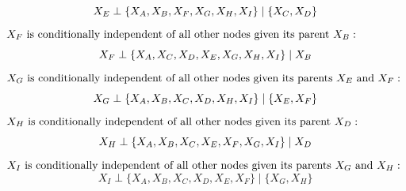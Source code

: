 \documentclass[a3paper,12pt]{extarticle} %
\begin{document}
\begin{enumerate}
\begin{enumerate}
    \)
    \[
        X_E \perp \{X_A, X_B, X_F, X_G, X_H, X_I\} \mid \{X_C, X_D\} \\
    \]
    \(
        X_F \text{ is conditionally independent of all other nodes given its parent } X_B: \\
    \)
    \[
        X_F \perp \{X_A, X_C, X_D, X_E, X_G, X_H, X_I\} \mid X_B \\
    \]
    \(
        X_G \text{ is conditionally independent of all other nodes given its parents } X_E \text{ and } X_F: \\
    \)
    \[
        X_G \perp \{X_A, X_B, X_C, X_D, X_H, X_I\} \mid \{X_E, X_F\} \\
    \]
    \(
        X_H \text{ is conditionally independent of all other nodes given its parent } X_D: \\
    \)
    \[
        X_H \perp \{X_A, X_B, X_C, X_E, X_F, X_G, X_I\} \mid X_D \\
    \]
    \(
        X_I \text{ is conditionally independent of all other nodes given its parents } X_G \text{ and } X_H: \\
    \)
    \[
        X_I \perp \{X_A, X_B, X_C, X_D, X_E, X_F\} \mid \{X_G, X_H\}
    \]
\end{enumerate}


\end{enumerate}
\end{document}
